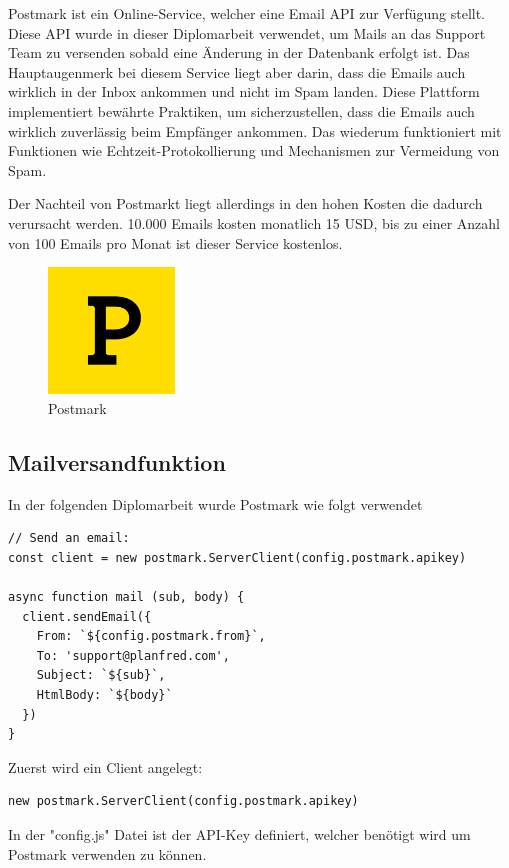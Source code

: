 Postmark ist ein Online-Service, welcher eine Email API zur Verfügung stellt. Diese API wurde in dieser Diplomarbeit verwendet, um Mails an das Support Team zu versenden sobald eine Änderung in der Datenbank erfolgt ist. Das Hauptaugenmerk bei diesem Service liegt aber darin, dass die Emails auch wirklich in der Inbox ankommen und nicht im Spam landen. Diese Plattform implementiert bewährte Praktiken, um sicherzustellen, dass die Emails auch wirklich zuverlässig beim Empfänger ankommen. Das wiederum funktioniert mit Funktionen wie Echtzeit-Protokollierung und Mechanismen zur Vermeidung von Spam.

Der Nachteil von Postmarkt liegt allerdings in den hohen Kosten die dadurch verursacht werden. 10.000 Emails kosten monatlich 15 USD, bis zu einer Anzahl von 100 Emails pro Monat ist dieser Service kostenlos.

\begin{figure}[h!]
    \centering
    \includegraphics[width=0.3\textwidth]{pics/postmark.png}
    \caption{Postmark}
    \label{fig:enter-label}
\end{figure}


\subsection{Mailversandfunktion}

In der folgenden Diplomarbeit wurde Postmark wie folgt verwendet


\begin{lstlisting}[caption=Implementierung Mailversandfunktion]
// Send an email:
const client = new postmark.ServerClient(config.postmark.apikey)

async function mail (sub, body) {
  client.sendEmail({
    From: `${config.postmark.from}`,
    To: 'support@planfred.com',
    Subject: `${sub}`,
    HtmlBody: `${body}`
  })
}
\end{lstlisting}

Zuerst wird ein Client angelegt:
\begin{lstlisting}
new postmark.ServerClient(config.postmark.apikey)
\end{lstlisting}
In der "config.js" Datei ist der API-Key definiert, welcher benötigt wird um Postmark verwenden zu können.

